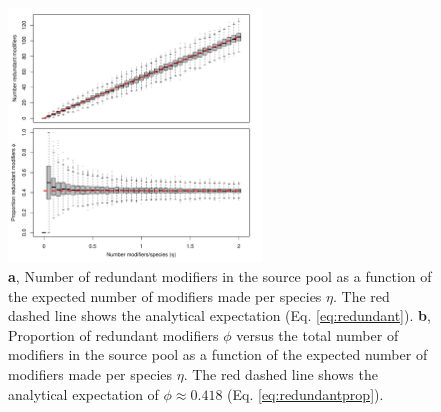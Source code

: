 \documentclass[twocolumn,preprintnumbers,amsmath,amssymb,superscriptaddress,linenumbers]{revtex4-1}
\begin{document}
% 

\begin{figure}[h!]
\centering
\includegraphics[width=0.6\textwidth]{fig_redundancy.pdf}
\caption{
\textbf{a}, Number of redundant modifiers in the source pool as a function of the expected number of modifiers made per species $\eta$.
The red dashed line shows the analytical expectation (Eq. \ref{eq:redundant}).
\textbf{b}, Proportion of redundant modifiers $\phi$ versus the total number of modifiers in the source pool as a function of the expected number of modifiers made per species $\eta$.
The red dashed line shows the analytical expectation of $\phi \approx 0.418$ (Eq. \ref{eq:redundantprop}).
}
\label{fig:redundancy}
\end{figure}
\end{document}

